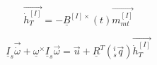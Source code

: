 
\begin{equation}
\label{eq:totalMomDyn}
\vec{\dot{h}_T^{[I]}} = -\underline{B}^{[I]\times}(t) \vec{m_{mt}^{[I]}} 
\end{equation}		

\begin{equation}
\underline I_{s} \vec{\dot{\omega}} + \underline{\omega}^\times\underline I_{s} \vec{\omega} =    
\vec{u} +  \underline{R}^T(^i_s\vec{q})\vec{\dot{h}_T^{[I]}}
\label{eq:newDesatDynInterpret}
\end{equation}
		
		

		
		
		

		

		
		
%		
%		
%		
%		
		
